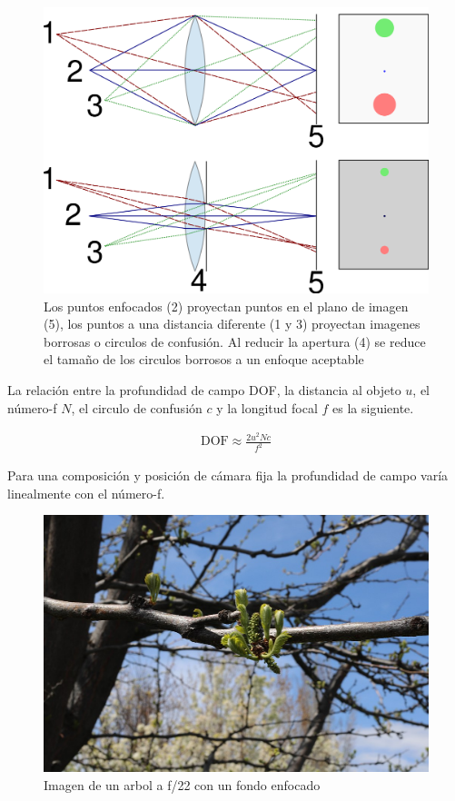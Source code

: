 \documentclass{article}
\begin{document}
\begin{figure}[H]
	\centering
	\includegraphics[width=0.85\linewidth]{Figuras/Circle_of_confusion_2}
	\caption{Los puntos enfocados (2) proyectan puntos en el plano de imagen (5), los puntos a una distancia diferente (1 y 3) proyectan imagenes borrosas o circulos de confusión. Al reducir la apertura (4) se reduce el tamaño de los circulos borrosos a un enfoque aceptable}
	\label{fig:circleofconfusion2}
\end{figure}


La relación entre la profundidad de campo DOF, la distancia al objeto $u$, el número-f $N$, el circulo de confusión $c$ y la longitud focal $f$ es la siguiente.

\begin{align*}
	\text{DOF} \approx \frac{2u^2Nc}{f^2}
\end{align*}

Para una composición y posición de cámara fija la profundidad de campo varía linealmente con el número-f.

\begin{figure}[H]
	\centering
	\includegraphics[width=0.75\linewidth]{Figuras/DOF_1}
	\caption{Imagen de un arbol a f/22 con un fondo enfocado}
	\label{fig:dof1}
\end{figure}
\end{document}
